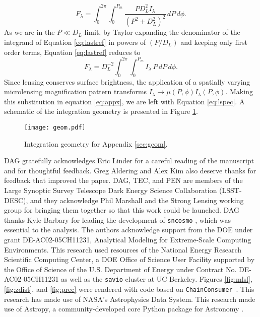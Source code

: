 \documentclass[iop,apj,numberedappendix,twocolappendix]{emulateapj}
\begin{document}
\begin{equation}
\label{eq:lastref}
F_\lambda = \int^{2\pi}_0 \int^{P_m}_0 \frac{ PD_L^2 I_\lambda }{(P^2 + D_L^2)^2}\, dP\, d\phi.
\end{equation}
As we are in the $P \ll D_L$ limit, by Taylor expanding the denominator of the integrand of Equation \ref{eq:lastref} in powers of $(P/D_L)$ and keeping only first order terms, Equation \ref{eq:lastref} reduces to 
\begin{equation}
F_\lambda = D_L^{-2} \int^{2\pi}_0 \int_0^{P_m} I_\lambda \, P \, dP \, d\phi.
\label{eq:appx}
\end{equation}
Since lensing conserves surface brightness, the application of a spatially varying microlensing magnification pattern transforms $I_\lambda \rightarrow \mu(P, \phi) I_\lambda(P, \phi)$. 
Making this substitution in equation \ref{eq:appx}, we are left with Equation \ref{eq:lspec}.
A schematic of the integration geometry is presented in Figure \ref{fig:geometry}. 

\begin{figure}
	\centering
    \texttt{[image: geom.pdf]}
    \caption{Integration geometry for Appendix \ref{sec:geom}.}
    \label{fig:geometry}
\end{figure}


\acknowledgements
DAG gratefully acknowledges Eric Linder for a careful reading of the manuscript and for thoughtful feedback.
Greg Aldering and Alex Kim also deserve thanks for feedback that improved the paper.
DAG, TEC, and PEN are members of the Large Synoptic Survey Telescope Dark Energy Science Collaboration (LSST-DESC), and they acknowledge Phil Marshall and the Strong Lensing working group for bringing them together so that this work could be launched.
DAG thanks Kyle Barbary for leading the development of \texttt{sncosmo} \citep{sncosmo}, which was essential to the analysis.
The authors acknowledge support from the DOE under grant DE-AC02-05CH11231, Analytical Modeling for Extreme-Scale Computing Environments. 
This research used resources of the National Energy Research Scientific Computing Center, a DOE Office of Science User Facility supported by the Office of Science of the U.S. Department of Energy under Contract No. DE-AC02-05CH11231 as well as the \texttt{savio} cluster at UC Berkeley.
Figures \ref{fig:mlsl}, \ref{fig:zdist}, and \ref{fig:prec} were rendered with code based on \texttt{ChainConsumer}\ \citep{chainconsumer}.
This research has made use of NASA's Astrophysics Data System. 
This research made use of Astropy, a community-developed core Python package for Astronomy \citep{astropy}.


\end{document}
